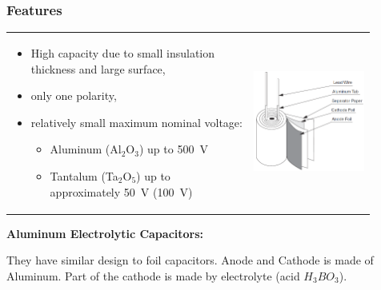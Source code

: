 \documentclass{beamer}
\begin{document}
	\begin{frame}
    \frametitle{Features}
		\begin{tabular}{m{0.6\linewidth} m{0.3\linewidth}}
		\begin{itemize}
			\item High capacity due to small insulation thickness and large surface,
			\item only one polarity,
			\item relatively small maximum nominal voltage:
			
			\begin{itemize}
				\item Aluminum (Al$_2$O$_3$) up to 500~V
				\item Tantalum (Ta$_2$O$_5$) up to approximately 50~V (100~V)
			\end{itemize}
		\end{itemize} & \includegraphics[scale=0.25]{obr14_elektrolytKonst.png}
		\end{tabular}
		\textbf{Aluminum Electrolytic Capacitors:}
		\begin{flushleft}
		They have similar design to foil capacitors. Anode and Cathode is made of Aluminum. Part of the cathode is made by electrolyte (acid $H_3BO_3$).
		\end{flushleft}
  \end{frame}
\end{document}
